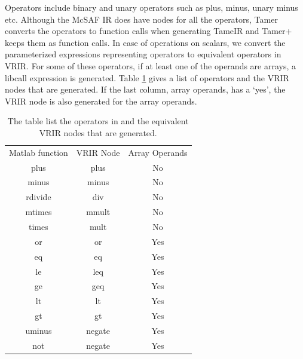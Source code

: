 Operators include binary and unary operators such as plus, minus, unary minus etc. Although the McSAF IR does have nodes for all the operators, Tamer converts the operators to function calls when generating TameIR and Tamer+ keeps them as function calls. In case of operations on scalars, we convert the parameterized expressions representing operators to equivalent operators in VRIR. For some of these operators, if at least one of the operands are arrays, a libcall expression is generated. Table \ref{tab:opGen} gives a list of \matlab operators  and the VRIR nodes that are generated. If the last column, array operands, has a `yes', the VRIR node is also generated for the array operands. 
\begin{table}[htbp]
\centering
\begin{tabular}{|c|c|c|}
\hline
Matlab function & VRIR Node & Array Operands \\ \hhline{|=|=|=|}
plus            & plus   & No   \\ \hline
minus           & minus  & No   \\ \hline
rdivide         & div    & No   \\ \hline
mtimes          & mmult  & No   \\ \hline
times           & mult   & No   \\ \hline
or              & or     & Yes   \\ \hline
eq              & eq     & Yes   \\ \hline
le              & leq    & Yes   \\ \hline
ge              & geq    & Yes   \\ \hline
lt              & lt     & Yes   \\ \hline
gt              & gt     & Yes   \\ \hline
uminus          & negate & Yes   \\ \hline
not             & negate & Yes   \\ \hline
\end{tabular}
\caption[List of operators in \matlab and their equivalent VRIR nodes]{ The table list the operators in \matlab and the equivalent VRIR nodes that are generated. }
\label{tab:opGen}
\end{table}

